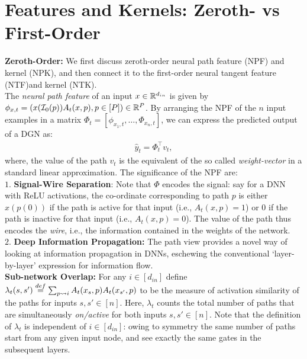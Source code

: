 \section{Features and Kernels: Zeroth- vs First-Order}
\textbf{Zeroth-Order:} We first discuss zeroth-order neural path feature (NPF) and kernel (NPK), and then connect it to the first-order neural tangent feature  (NTF)and kernel (NTK).\hfill\\
The \emph{neural path feature} of an input $x\in \mathbb{R}^{d_{in}}$ is given by $\phi_{x,t}=(x(\mathcal{I}_0(p))A_t(x,p) ,p\in[P])\in\mathbb{R}^P$. By arranging the NPF of the $n$ input examples in a matrix $\Phi_t=\left[\phi_{x_1,t},\ldots, \Phi_{x_n,t}\right]$, we can express the predicted output of a DGN as: \begin{align}\label{eq:npfbasic}\hat{y}_t=\Phi_t^\top v_t,\end{align}
where, the value of the path $v_t$ is the equivalent of the so called \emph{weight-vector} in a standard linear approximation. The significance of the NPF are:\hfill\\
$1.$ \textbf{Signal-Wire Separation}: Note that $\Phi$ encodes the signal: say for a DNN with ReLU activations, the co-ordinate corresponding to path $p$ is either $x(p(0))$ if the path is active for that input (i.e., $A_t(x,p)=1$) or $0$ if the path is inactive for that input  (i.e., $A_t(x,p)=0$). The value of the path thus encodes the \emph{wire}, i.e., the information contained in the weights of the network. \hfill\\
$2.$ \textbf{Deep Information Propagation:} The path view provides a novel way of looking at information propagation in DNNs, eschewing the conventional `layer-by-layer' expression for information flow.\hfill\\
\textbf{Sub-network Overlap:} For any $i\in [d_{in}]$ define $\lambda_t(s,s')\stackrel{def}{=}\sum_{p\rightsquigarrow i} A_t(x_s,p) A_t(x_{s'},p)$ to be the measure of activation similarity of the paths for inputs $s,s'\in[n]$. Here, $\lambda_t$ counts the total number of paths that are simultaneously \emph{on/active} for both inputs $s,s'\in[n]$. Note that the definition of $\lambda_t$ is independent of $i\in [d_{in}]$: owing to symmetry the same number of paths start from any given input node, and see exactly the same gates in the subsequent layers.

